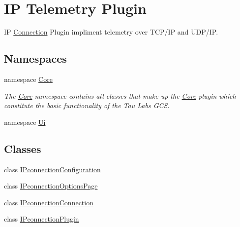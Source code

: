 \hypertarget{group___i_p_conn_plugin}{\section{I\-P Telemetry Plugin}
\label{group___i_p_conn_plugin}
}


I\-P \hyperlink{struct_connection}{Connection} Plugin impliment telemetry over T\-C\-P/\-I\-P and U\-D\-P/\-I\-P.  


\subsection*{Namespaces}
\begin{DoxyCompactItemize}
\item 
namespace \hyperlink{namespace_core}{Core}
\begin{DoxyCompactList}\small\item\em The \hyperlink{namespace_core}{Core} namespace contains all classes that make up the \hyperlink{namespace_core}{Core} plugin which constitute the basic functionality of the Tau Labs G\-C\-S. \end{DoxyCompactList}\item 
namespace \hyperlink{namespace_ui}{Ui}
\end{DoxyCompactItemize}
\subsection*{Classes}
\begin{DoxyCompactItemize}
\item 
class \hyperlink{class_i_pconnection_configuration}{I\-Pconnection\-Configuration}
\item 
class \hyperlink{class_i_pconnection_options_page}{I\-Pconnection\-Options\-Page}
\item 
class \hyperlink{class_i_pconnection_connection}{I\-Pconnection\-Connection}
\item 
class \hyperlink{class_i_pconnection_plugin}{I\-Pconnection\-Plugin}
\end{DoxyCompactItemize}
